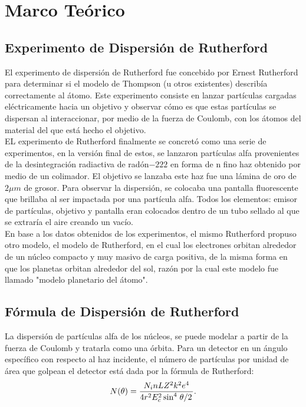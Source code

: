 \documentclass[conference]{IEEEtran}
\begin{document}
\section{Marco Teórico}
\subsection{Experimento de Dispersión de Rutherford}
El experimento de dispersión de Rutherford fue concebido por Ernest Rutherford para determinar si el modelo de Thompson  (u otros existentes) describía correctamente al átomo. Este experimento consiste en lanzar partículas cargadas eléctricamente hacia un objetivo y observar cómo es que estas partículas se dispersan al interaccionar, por medio de la fuerza de Coulomb, con los átomos del material del que está hecho el objetivo. \\

EL experimento de Rutherford finalmente se concretó como una serie de experimentos, en la versión final de estos, se lanzaron partículas alfa provenientes de la desintegración radiactiva de radón$-222$ en forma de n fino haz obtenido por medio de un colimador. El objetivo se lanzaba este haz fue una lámina de oro de $2\mu m$ de grosor. Para observar la dispersión, se colocaba una pantalla fluorescente que brillaba al ser impactada por una partícula alfa. Todos los elementos: emisor de partículas, objetivo y pantalla eran colocados dentro de un tubo sellado al que se extraría el aire creando un vacío. \\

En base a los datos obtenidos de los experimentos, el mismo Rutherford propuso otro modelo, el modelo de Rutherford, en el cual los electrones orbitan alrededor de un núcleo compacto y muy masivo de carga positiva, de la misma forma en que los planetas orbitan alrededor del sol, razón por la cual este modelo fue llamado "modelo planetario del átomo".


\subsection{Fórmula de Dispersión de Rutherford}
La dispersión de partículas alfa de los núcleos, se puede modelar a partir de la fuerza de Coulomb y tratarla como una órbita. Para un detector en un ángulo específico con respecto al haz incidente, el número de partículas por unidad de área que golpean el detector está dada por la fórmula de Rutherford: 
\begin{equation}
	N(\theta) = \frac{ N_i nLZ^2 k^2 e^4 }{ 4r^2 E_c ^2 \sin ^4 {\flatfrac{\theta}{2}} }. \label{Ntheta}
\end{equation}
\end{document}
